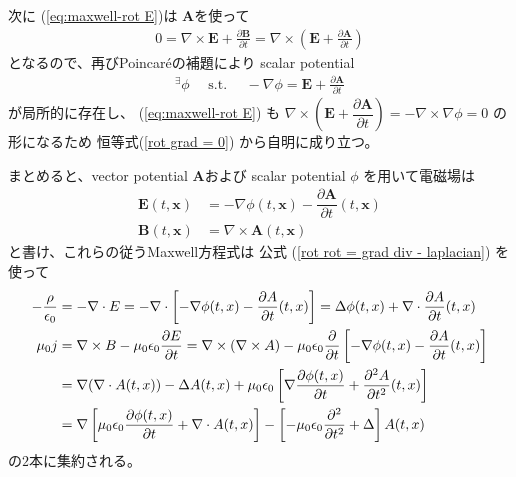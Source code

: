 次に
(\ref{eq:maxwell-rot E})は
$\bm{A}$を使って
\begin{align}
  0 =
  \nabla \times \bm{E}
  +
  \frac{\partial \bm{B}}
    {\partial t}
=
  \nabla \times
  \left(
    \bm{E}
    +
    \frac{\partial \bm{A}}
      {\partial t}      
  \right)
\end{align}
となるので、再びPoincar\'eの補題により
scalar potential
\begin{align}
  {}^\exists \phi
\quad
\text{ s.t. }
\quad
  - \nabla \phi
=
  \bm{E}
  +
  \frac{\partial \bm{A}}
    {\partial t}
\end{align}
が局所的に存在し、
(\ref{eq:maxwell-rot E})
も
$\nabla \times
\left(
  \bm{E} +
  \dfrac{\partial \bm{A}}
    {\partial t}
\right)
= - \nabla \times \nabla \phi
= 0$
の形になるため
恒等式(\ref{rot grad = 0})
から自明に成り立つ。

まとめると、vector potential
$\bm{A}$および
scalar potential $\phi$
を用いて電磁場は
\begin{subequations}
\begin{align}
  \bm{E} (t, \bm{x})
&=
  - \nabla \phi (t, \bm{x})
  - \dfrac{\partial \bm{A}}
    {\partial t} (t, \bm{x})
\\
  \bm{B} (t, \bm{x})
&=
  \nabla \times
  \bm{A} (t, \bm{x})
\end{align}
\end{subequations}
と書け、これらの従うMaxwell方程式は
公式
(\ref{rot rot = grad div - laplacian})
を使って
\begin{subequations}
\begin{align}
  - \frac{\rho}{\epsilon_0}
&=
  - \nabla \cdot E
=
  - \nabla \cdot
  \left[
    - \nabla \phi (t, x)
    - \dfrac{\partial A}
      {\partial t} (t, x)
  \right]
=
  \Delta \phi (t, x)
  +
    \nabla \cdot
    \dfrac{\partial A}
      {\partial t} (t, x)
\\
  \mu_0 j
&=
  \nabla \times B
  -
  \mu_0 \epsilon_0
    \frac{\partial E}
      {\partial t}
=
  \nabla \times
    (\nabla \times A)
  -
  \mu_0 \epsilon_0
    \frac{\partial}{\partial t}
  \left[
    - \nabla \phi (t, x)
    - \dfrac{\partial A}
      {\partial t} (t, x)
  \right]
\notag\\&
=
  \nabla
    (\nabla \cdot A (t, x))
  -
    \Delta A (t, x)
  +
  \mu_0 \epsilon_0
  \left[
    \nabla
    \frac{\partial \phi (t, x)}
      {\partial t}
  +
    \dfrac{\partial^2 A}
      {\partial t^2} (t, x)
  \right]
\notag\\&
=
  \nabla
  \left[
    \mu_0 \epsilon_0
    \frac{\partial \phi (t, x)}
      {\partial t}
  +
    \nabla \cdot
      A (t, x)
  \right]
  -
  \left[
    - \mu_0 \epsilon_0
    \dfrac{\partial^2}{\partial t^2}
  +
    \Delta
  \right]
    A (t, x)
\end{align}
\label{maxwell eq of potentials}
\end{subequations}
の$2$本に集約される。

